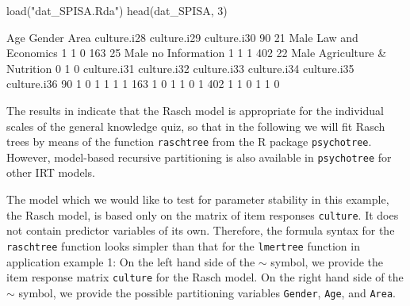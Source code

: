 \documentclass[doc,floatsintext,natbib]{apa7}
\begin{document}

\begin{Schunk}
\begin{Sinput}
 load("dat_SPISA.Rda")
 head(dat_SPISA, 3)
\end{Sinput}
\begin{Soutput}
    Age Gender                    Area culture.i28 culture.i29 culture.i30
90   21   Male       Law and Economics           1           1           0
163  25   Male          no Information           1           1           1
402  22   Male Agriculture & Nutrition           0           1           0
    culture.i31 culture.i32 culture.i33 culture.i34 culture.i35 culture.i36
90            1           0           1           1           1           1
163           1           0           1           1           0           1
402           1           1           0           1           1           0
\end{Soutput}
\end{Schunk}

The results in \citet{SPISA:book} indicate that the Rasch model is appropriate for the individual scales of the general knowledge quiz, so that in the following we will fit Rasch trees by means of the function \texttt{raschtree} from the R package \texttt{psychotree}. However, model-based recursive partitioning is also available in \texttt{psychotree} for other IRT models.

The model which we would like to test for parameter stability in this example, the Rasch model, is based only on the matrix of item responses \texttt{culture}. It does not contain predictor variables of its own. Therefore, the formula syntax for the \texttt{raschtree} function looks simpler than that for the \texttt{lmertree} function in application example 1: On the left hand side of the $\sim$ symbol, we provide the item response matrix \texttt{culture} for the Rasch model. On the right hand side of the $\sim$ symbol, we provide the possible partitioning variables \texttt{Gender}, \texttt{Age}, and \texttt{Area}.
\end{document}
